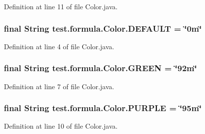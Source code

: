Definition at line 11 of file Color.\+java.

\hypertarget{classtest_1_1formula_1_1_color_ac27ae5dedb3ac58be818cbfdb373e183}{}
\subsubsection[{D\+E\+F\+A\+U\+L\+T}]{\setlength{\rightskip}{0pt plus 5cm}final String test.\+formula.\+Color.\+D\+E\+F\+A\+U\+L\+T = \char`\"{}0m\char`\"{}\hspace{0.3cm}{\ttfamily [static]}}\label{classtest_1_1formula_1_1_color_ac27ae5dedb3ac58be818cbfdb373e183}


Definition at line 4 of file Color.\+java.

\hypertarget{classtest_1_1formula_1_1_color_a636d367365497327f443612fc5ee808c}{}
\subsubsection[{G\+R\+E\+E\+N}]{\setlength{\rightskip}{0pt plus 5cm}final String test.\+formula.\+Color.\+G\+R\+E\+E\+N = \char`\"{}92m\char`\"{}\hspace{0.3cm}{\ttfamily [static]}}\label{classtest_1_1formula_1_1_color_a636d367365497327f443612fc5ee808c}


Definition at line 7 of file Color.\+java.

\hypertarget{classtest_1_1formula_1_1_color_ad6dd9400e3c4f1b01e8a581db4523438}{}
\subsubsection[{P\+U\+R\+P\+L\+E}]{\setlength{\rightskip}{0pt plus 5cm}final String test.\+formula.\+Color.\+P\+U\+R\+P\+L\+E = \char`\"{}95m\char`\"{}\hspace{0.3cm}{\ttfamily [static]}}\label{classtest_1_1formula_1_1_color_ad6dd9400e3c4f1b01e8a581db4523438}


Definition at line 10 of file Color.\+java.

